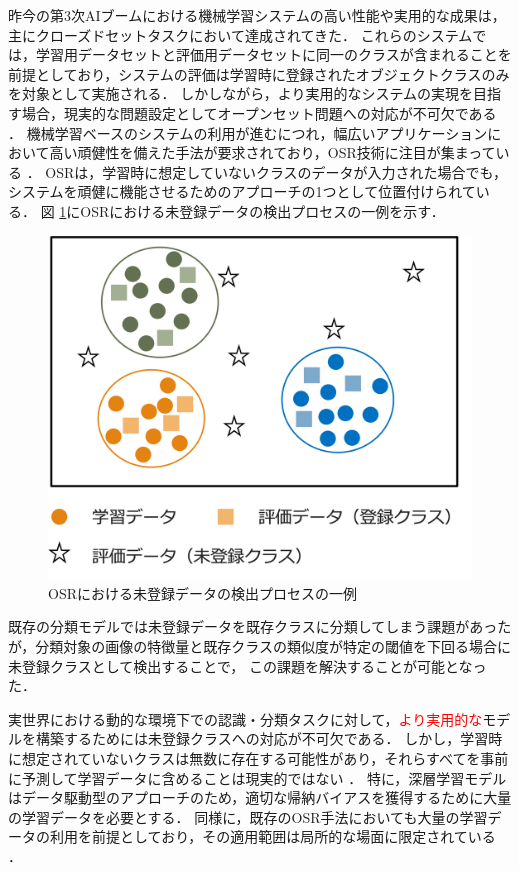 \documentclass[a4paper,11pt,nomag]{jsreport}
\begin{document}
昨今の第3次AIブームにおける機械学習システムの高い性能や実用的な成果は，主にクローズドセットタスクにおいて達成されてきた．
これらのシステムでは，学習用データセットと評価用データセットに同一のクラスが含まれることを前提としており，システムの評価は学習時に登録されたオブジェクトクラスのみを対象として実施される．
しかしながら，より実用的なシステムの実現を目指す場合，現実的な問題設定としてオープンセット問題への対応が不可欠である \cite{geng2021survey}．
機械学習ベースのシステムの利用が進むにつれ，幅広いアプリケーションにおいて高い頑健性を備えた手法が要求されており，OSR技術に注目が集まっている \cite{sun2023survey}．
OSRは，学習時に想定していないクラスのデータが入力された場合でも，システムを頑健に機能させるためのアプローチの1つとして位置付けられている．
図 \ref{fig:osr}にOSRにおける未登録データの検出プロセスの一例を示す．
% 
\begin{figure}[tbp]
  \centering
  \includegraphics[width=0.6\linewidth, keepaspectratio]{image/osr.png}
  \caption{OSRにおける未登録データの検出プロセスの一例}
  \label{fig:osr}
\end{figure}
% 
既存の分類モデルでは未登録データを既存クラスに分類してしまう課題があったが，分類対象の画像の特徴量と既存クラスの類似度が特定の閾値を下回る場合に未登録クラスとして検出することで，
この課題を解決することが可能となった．

実世界における動的な環境下での認識・分類タスクに対して，\textcolor{red}{より実用的な}モデルを構築するためには未登録クラスへの対応が不可欠である．
しかし，学習時に想定されていないクラスは無数に存在する可能性があり，それらすべてを事前に予測して学習データに含めることは現実的ではない \cite{mahdavi2021survey}．
特に，深層学習モデルはデータ駆動型のアプローチのため，適切な帰納バイアスを獲得するために大量の学習データを必要とする．
同様に，既存のOSR手法においても大量の学習データの利用を前提としており，その適用範囲は局所的な場面に限定されている \cite{wang2023}．
\end{document}
